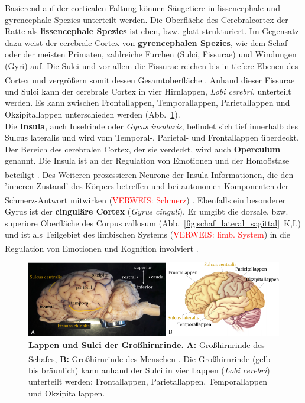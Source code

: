 \documentclass[12pt,a4paper,pdftex]{article}
\begin{document}
Basierend auf der corticalen Faltung können Säugetiere in lissencephale und gyrencephale Spezies unterteilt werden. Die Oberfläche des Cerebralcortex der Ratte als \textbf{lissencephale Spezies} ist eben, bzw. glatt strukturiert. Im Gegensatz dazu weist der cerebrale Cortex von \textbf{gyrencephalen Spezies}, wie dem Schaf oder der meisten Primaten, zahlreiche Furchen (Sulci, Fissurae) und Windungen (Gyri) auf. Die Sulci und vor allem die Fissurae reichen bis in tiefere Ebenen des Cortex und vergrößern somit dessen Gesamtoberfläche \textsuperscript{\cite[7]{watson2010thebrain}}. Anhand dieser Fissurae und Sulci kann der cerebrale Cortex in vier Hirnlappen, \textit{Lobi cerebri}, unterteilt werden. Es kann zwischen Frontallappen, Temporallappen, Parietallappen und Okzipitallappen unterschieden werden (Abb.~\ref{fig:cortex_lappen}).\\

\noindent Die \textbf{Insula}, auch Inselrinde oder \textit{Gyrus insularis}, befindet sich tief innerhalb des Sulcus lateralis und wird vom Temporal-, Parietal- und Frontallappen überdeckt. Der Bereich des cerebralen Cortex, der sie verdeckt, wird auch \textbf{Operculum} genannt. Die Insula ist an der Regulation von Emotionen und der Homoöstase beteiligt \textsuperscript{\cite[15]{kandel2013principles}}. Des Weiteren prozessieren Neurone der Insula Informationen, die den 'inneren Zustand' des Körpers betreffen und bei autonomen Komponenten der Schmerz-Antwort mitwirken (\textcolor{red}{VERWEIS: Schmerz}) \textsuperscript{\cite[24]{kandel2013principles}}. Ebenfalls ein besonderer Gyrus ist der \textbf{cinguläre Cortex} (\textit{Gyrus cinguli}). Er umgibt die dorsale, bzw. superiore Oberfläche des Corpus callosum (Abb.~\ref{fig:schaf_lateral_sagittal}~K,L) und ist als Teilgebiet des limbischen Systems (\textcolor{red}{VERWEIS: limb. System}) in die Regulation von Emotionen und Kognition involviert \textsuperscript{\cite[15]{kandel2013principles}}.

\begin{figure}[H]
	\centering
	\includegraphics[width=\textwidth]{pictures/Bilder_Jule/Andere/grosshirnrinde.png}
	\caption[Lappen und Sulci der Großhirnrinde]{\textbf{Lappen und Sulci der Großhirnrinde.} \textbf{A:} Großhirnrinde des Schafes, \textbf{B:} Großhirnrinde des Menschen \textsuperscript{\cite[7]{neurowissenschaften_baer}}. Die Großhirnrinde (gelb bis bräunlich) kann anhand der Sulci in vier Lappen (\textit{Lobi cerebri}) unterteilt werden: Frontallappen, Parietallappen, Temporallappen und Okzipitallappen.}
	\label{fig:cortex_lappen} 
\end{figure}
\end{document}
